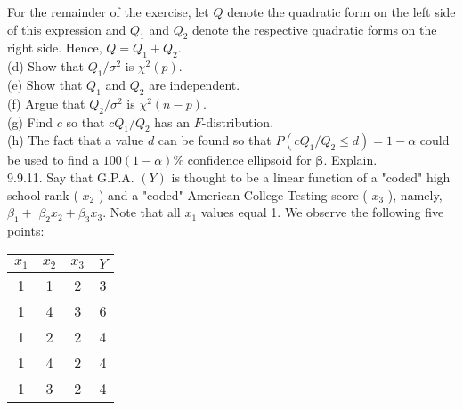 For the remainder of the exercise, let $Q$ denote the quadratic form on the left side of this expression and $Q_{1}$ and $Q_{2}$ denote the respective quadratic forms on the right side. Hence, $Q=Q_{1}+Q_{2}$.\\
(d) Show that $Q_{1} / \sigma^{2}$ is $\chi^{2}(p)$.\\
(e) Show that $Q_{1}$ and $Q_{2}$ are independent.\\
(f) Argue that $Q_{2} / \sigma^{2}$ is $\chi^{2}(n-p)$.\\
(g) Find $c$ so that $c Q_{1} / Q_{2}$ has an $F$-distribution.\\
(h) The fact that a value $d$ can be found so that $P\left(c Q_{1} / Q_{2} \leq d\right)=1-\alpha$ could be used to find a $100(1-\alpha) \%$ confidence ellipsoid for $\boldsymbol{\beta}$. Explain.\\
9.9.11. Say that G.P.A. $(Y)$ is thought to be a linear function of a "coded" high school rank ( $x_{2}$ ) and a "coded" American College Testing score ( $x_{3}$ ), namely, $\beta_{1}+$ $\beta_{2} x_{2}+\beta_{3} x_{3}$. Note that all $x_{1}$ values equal 1. We observe the following five points:

\begin{center}
\begin{tabular}{cccc}
\hline
$x_{1}$ & $x_{2}$ & $x_{3}$ & $Y$ \\
\hline
1 & 1 & 2 & 3 \\
1 & 4 & 3 & 6 \\
1 & 2 & 2 & 4 \\
1 & 4 & 2 & 4 \\
1 & 3 & 2 & 4 \\
\hline
\end{tabular}
\end{center}

